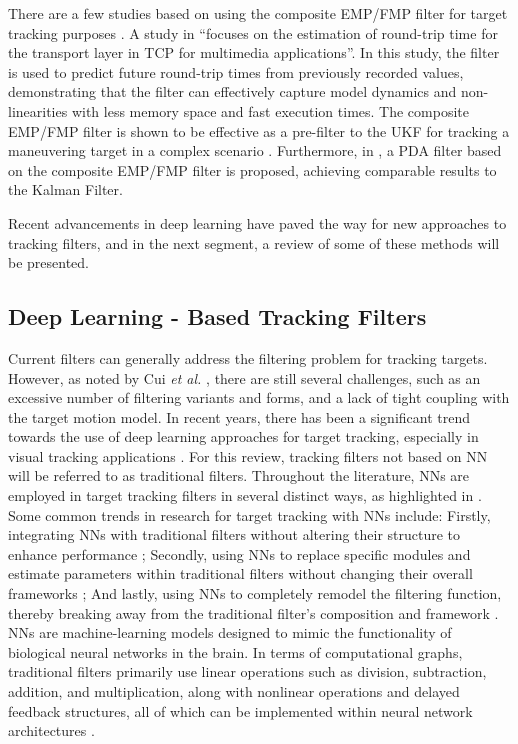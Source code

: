There are a few studies based on using the composite \ac{EMP}/\ac{FMP} filter for target tracking purposes \cite{Lu2020, Nadjiasngar2011a}. A study in \cite{Lusilao-Zodi2010} \textquotedblleft focuses on the estimation of round-trip time for the transport layer in \ac{TCP} for multimedia applications\textquotedblright. In this study, the filter is used to predict future round-trip times from previously recorded values, demonstrating that the filter can effectively capture model dynamics and non-linearities with less memory space and fast execution times. The composite \ac{EMP}/\ac{FMP} filter is shown to be effective as a pre-filter to the \ac{UKF} for tracking a maneuvering target in a complex scenario \cite{Lu2020}. Furthermore, in \cite{Nadjiasngar2011a}, a \ac{PDA} filter based on the composite \ac{EMP}/\ac{FMP} filter is proposed, achieving comparable results to the Kalman Filter. 

Recent advancements in deep learning have paved the way for new approaches to tracking filters, and in the next segment, a review of some of these methods will be presented.


\subsection{Deep Learning - Based Tracking Filters}
Current filters can generally address the filtering problem for tracking targets. However, as noted by Cui \textit{et al.} \cite{cui2022}, there are still several challenges, such as an excessive number of filtering variants and forms, and a lack of tight coupling with the target motion model. In recent years, there has been a significant trend towards the use of deep learning approaches for target tracking, especially in visual tracking applications \cite{Yang2017,Supreeth2018,Bouzenada2007}. For this review, tracking filters not based on \ac{NN} will be referred to as traditional filters.
\newline
\newline
Throughout the literature, \ac{NN}s are employed in target tracking filters in several distinct ways, as highlighted in  \cite{cui2022}. Some common trends in research for target tracking with \ac{NN}s include: Firstly, integrating \ac{NN}s with traditional filters without altering their structure to enhance performance \cite{Duh2004}; Secondly, using \ac{NN}s to replace specific modules and estimate parameters within traditional filters without changing their overall frameworks \cite{Xu2023}; And lastly, using \ac{NN}s to completely remodel the filtering function, thereby breaking away from the traditional filter's composition and framework \cite{cui2022}. \ac{NN}s are machine-learning models designed to mimic the functionality of biological neural networks in the brain. In terms of computational graphs, traditional filters primarily use linear operations such as division, subtraction, addition, and multiplication, along with nonlinear operations and delayed feedback structures, all of which can be implemented within neural network architectures \cite{cui2022}.

